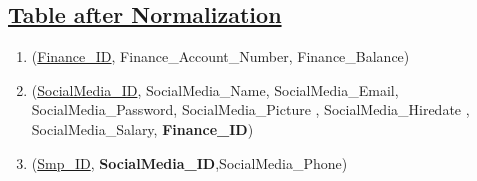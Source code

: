 \subsection*{\underline{Table after Normalization}}
\begin{enumerate}
    \item (\underline{Finance\_ID}, Finance\_Account\_Number, Finance\_Balance)
    \item (\underline{SocialMedia\_ID}, SocialMedia\_Name, SocialMedia\_Email, SocialMedia\_Password, SocialMedia\_Picture ,  SocialMedia\_Hiredate , SocialMedia\_Salary, \textbf{Finance\_ID})
    \item (\underline{Smp\_ID}, \textbf{SocialMedia\_ID},{SocialMedia\_Phone})
\end{enumerate}
\clearpage